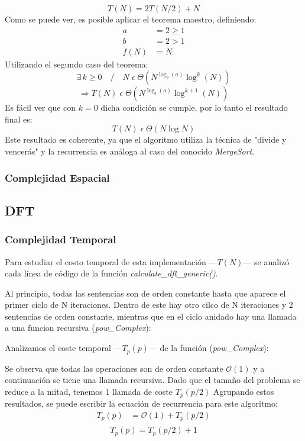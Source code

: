 \documentclass{article}
\begin{document}
    \begin{equation*}
      \boxed{T(N) = 2T(N/2) + N}
    \end{equation*}
      Como se puede ver, es posible aplicar el teorema maestro, definiendo:
    \begin{align*}
      a &= 2 \geq 1 \\
      b &= 2 > 1\\
   f(N) &= N
    \end{align*}
      Utilizando el segundo caso del teorema:
    $$ \exists\,k \geq 0 \quad / \quad N \;\epsilon\; \Theta (N^{\log_b (a)} \log^k (N)) $$
    $$ \Rightarrow T(N)\;\epsilon\;\Theta (N^{\log_b (a)} \log^{k+1} (N)) $$
      Es fácil ver que con $k=0$ dicha condición se cumple, por lo tanto
    el resultado final es:
    $$ \boxed{T(N)\;\epsilon\;\Theta (N \log N)} $$
      Este resultado es coherente, ya que el algoritmo utiliza la técnica de 
    "divide y vencerás" y la recurrencia es análoga al caso del conocido 
    \textit{MergeSort}.
    \subsubsection{Complejidad Espacial}
     
     
    \subsection{DFT}
    \subsubsection{Complejidad Temporal}
      Para estudiar el costo temporal de esta implementación ---$T(N)$--- se analizó
    cada línea de código de la función \textit{calculate\_dft\_generic()}.\par
    Al principio, todas las sentencias son de orden constante hasta que
    aparece el primer ciclo de N iteraciones. Dentro de este hay otro cilco de N 
  iteraciones y 2 sentencias de orden constante, mientras que en el ciclo anidado 
  hay una llamada a una funcion recursiva (\textit{pow\_Complex}):
  
  Analizamos el coste temporal ---$T_p(p)$--- de la función (\textit{pow\_Complex}):
  
    Se observa que todas las operaciones son de orden constante $\mathcal{O}(1)$ 
    y a continuación se tiene una llamada recursiva. Dado que el tamaño del problema se reduce 
    a la mitad, tenemos 1 llamada de coste $T_p(p/2)$
    Agrupando estos resultados, se puede escribir la
      ecuación de recurrencia para este algoritmo:
    \begin{align*}
      T_p(p) &= \mathcal{O}(1) + T_p(p/2)\\
  \end{align*}
      \begin{equation*}
        \boxed{T_p(p) = T_p(p/2) + 1}
      \end{equation*}
    
\end{document}
